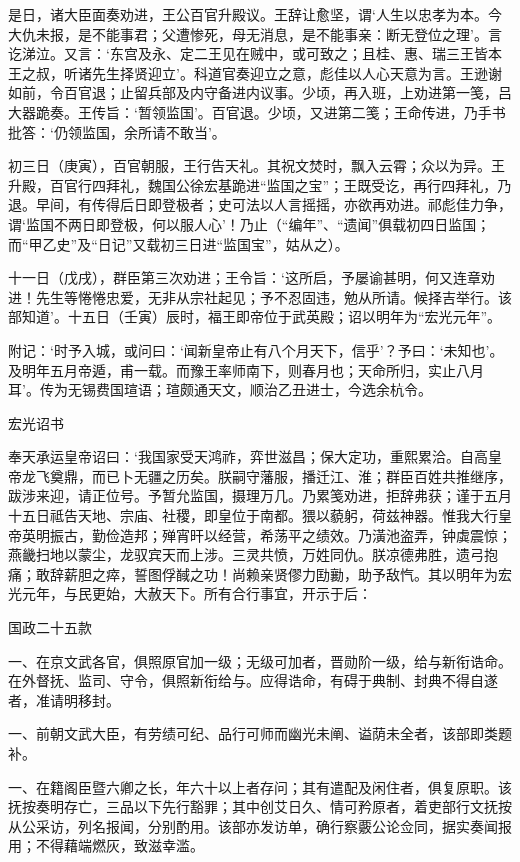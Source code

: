 \documentclass[]{article}
\begin{document}
是日，诸大臣面奏劝进，王公百官升殿议。王辞让愈坚，谓`人生以忠孝为本。今大仇未报，是不能事君；父遭惨死，母无消息，是不能事亲：断无登位之理'。言讫涕泣。又言：`东宫及永、定二王见在贼中，或可致之；且桂、惠、瑞三王皆本王之叔，听诸先生择贤迎立'。科道官奏迎立之意，彪佳以人心天意为言。王逊谢如前，令百官退；止留兵部及内守备进内议事。少顷，再入班，上劝进第一笺，吕大器跪奏。王传旨：`暂领监国'。百官退。少顷，又进第二笺；王命传进，乃手书批答：`仍领监国，余所请不敢当'。

初三日（庚寅），百官朝服，王行告天礼。其祝文焚时，飘入云霄；众以为异。王升殿，百官行四拜礼，魏国公徐宏基跪进``监国之宝''；王既受讫，再行四拜礼，乃退。早间，有传得后日即登极者；史可法以人言摇摇，亦欲再劝进。祁彪佳力争，谓`监国不两日即登极，何以服人心'！乃止（``编年''、``遗闻''俱载初四日监国；而``甲乙史''及``日记''又载初三日进``监国宝''，姑从之）。

十一日（戊戌），群臣第三次劝进；王令旨：`这所启，予屡谕甚明，何又连章劝进！先生等惓惓忠爱，无非从宗社起见；予不忍固违，勉从所请。候择吉举行。该部知道'。十五日（壬寅）辰时，福王即帝位于武英殿；诏以明年为``宏光元年''。

附记：`时予入城，或问曰：`闻新皇帝止有八个月天下，信乎'？予曰：`未知也'。及明年五月帝遁，甫一载。而豫王率师南下，则春月也；天命所归，实止八月耳'。传为无锡费国瑄语；瑄颇通天文，顺治乙丑进士，今选余杭令。

宏光诏书

奉天承运皇帝诏曰：`我国家受天鸿祚，弈世滋昌；保大定功，重熙累洽。自高皇帝龙飞奠鼎，而已卜无疆之历矣。朕嗣守藩服，播迁江、淮；群臣百姓共推继序，跋涉来迎，请正位号。予暂允监国，摄理万几。乃累笺劝进，拒辞弗获；谨于五月十五日祗告天地、宗庙、社稷，即皇位于南都。猥以藐躬，荷兹神器。惟我大行皇帝英明振古，勤俭造邦；殚宵旰以经营，希荡平之绩效。乃潢池盗弄，钟虡震惊；燕畿扫地以蒙尘，龙驭宾天而上涉。三灵共愤，万姓同仇。朕凉德弗胜，遗弓抱痛；敢辞薪胆之瘁，誓图俘馘之功！尚赖亲贤僇力劻勷，助予敌忾。其以明年为宏光元年，与民更始，大赦天下。所有合行事宜，开示于后：

国政二十五款

一、在京文武各官，俱照原官加一级；无级可加者，晋勋阶一级，给与新衔诰命。在外督抚、监司、守令，俱照新衔给与。应得诰命，有碍于典制、封典不得自遂者，准请明移封。

一、前朝文武大臣，有劳绩可纪、品行可师而幽光未阐、谥荫未全者，该部即类题补。

一、在籍阁臣暨六卿之长，年六十以上者存问；其有遣配及闲住者，俱复原职。该抚按奏明存亡，三品以下先行豁罪；其中创艾日久、情可矜原者，着吏部行文抚按从公采访，列名报闻，分别酌用。该部亦发访单，确行察覈公论佥同，据实奏闻报用；不得藉端燃灰，致滋幸滥。
\end{document}
